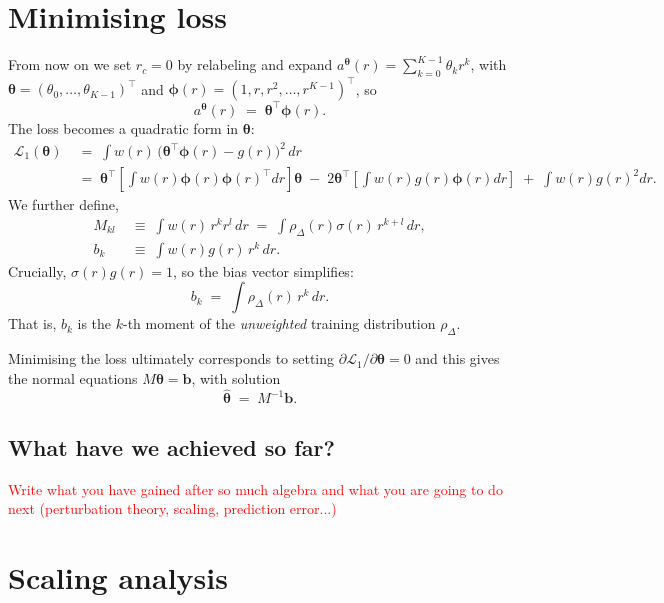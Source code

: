 \documentclass[11pt,a4paper]{article}
\theoremstyle{remark}
\newcommand{\bphi}{\boldsymbol{\phi}}
\newcommand{\btheta}{\boldsymbol{\theta}}
\newcommand{\bhattheta}{\hat{\boldsymbol{\theta}}}
\newcommand{\Th}{{\btheta}}
\def\sgp#1{{\sf\textcolor{red}{#1}}}
\begin{document}
\begin{onehalfspace}
\section{Minimising loss}
From now on we set $r_c = 0$ by relabeling and expand $a^\Th(r) = \sum_{k=0}^{K-1} \theta_k r^k$, with $\btheta = (\theta_0, \ldots, \theta_{K-1})^\top$ and $\bphi(r) = (1, r, r^2, \ldots, r^{K-1})^\top$, so
\[
a^\Th(r) \;=\; \btheta^\top \bphi(r).
\]
The loss becomes a quadratic form in $\btheta$:
\begin{align}
\mathcal{L}_1(\Th) &\;=\; \int w(r)\, \big(\btheta^\top \bphi(r) - g(r)\big)^2\, dr \nonumber\\
&\;=\; \btheta^\top \!\left[\int w(r)\bphi(r)\bphi(r)^\top dr\right]\! \btheta \;-\; 2\btheta^\top \!\left[\int w(r) g(r) \bphi(r) dr\right] \;+\; \int w(r) g(r)^2 dr.
\end{align}
We further define,
\begin{align}
M_{kl} &\;\equiv\; \int w(r)\, r^k r^l\, dr \;=\; \int \rho_\Delta(r) \sigma(r)\, r^{k+l}\, dr, \label{eq:Mkl}\\
b_k &\;\equiv\; \int w(r) g(r)\, r^k\, dr.\label{eq:bk}
\end{align}
Crucially, $\sigma(r) g(r) = 1$, so the bias vector simplifies:
\begin{equation}
b_k \;=\; \int \rho_\Delta(r)\, r^k\, dr.
\label{eq:bk_simple}
\end{equation}
That is, $b_k$ is the $k$-th moment of the \emph{unweighted} training distribution $\rho_\Delta$.

Minimising the loss ultimately corresponds to setting $\partial \mathcal{L}_1 / \partial \btheta = 0$ and this gives the normal equations $M \btheta = \mathbf{b}$, with solution
\begin{equation}
\bhattheta \;=\; M^{-1} \mathbf{b}.
\label{eq:hattheta_pop}
\end{equation}

\subsection{What have we achieved so far?}
\sgp{Write what you have gained after so much algebra and what you are going to do next (perturbation theory, scaling, prediction error...)}

\section{Scaling analysis}
\label{sec:scaling_rigorous}


\end{onehalfspace}
\end{document}
